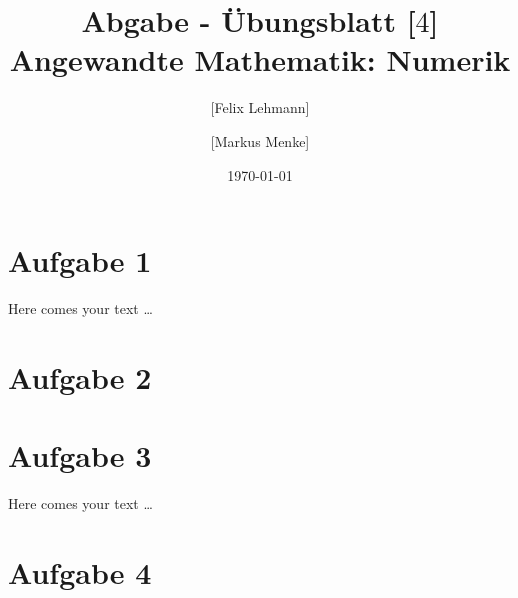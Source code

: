 \documentclass[10pt,a4paper]{article}
\begin{document}
\title{Abgabe - Übungsblatt [$4$]\\
\small{Angewandte Mathematik: Numerik}}
\author{ [Felix Lehmann] \and [Markus Menke]}
\date{\today}
\maketitle

\section*{Aufgabe 1}
Here comes your text \ldots

\section*{Aufgabe 2}


\section*{Aufgabe 3}
Here comes your text \ldots

\section*{Aufgabe 4}

\end{document}
